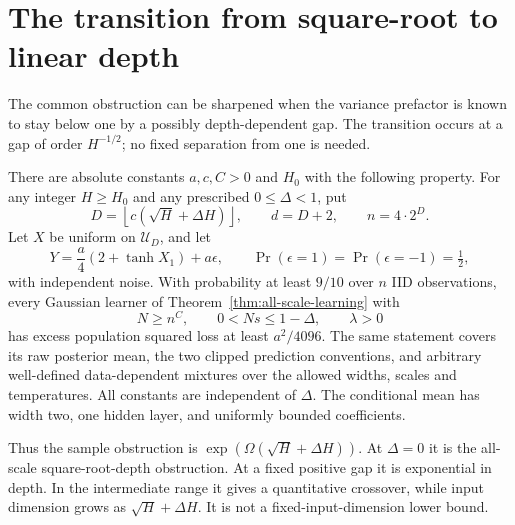 \section{The transition from square-root to linear depth}
\label{sec:prefactor-window}
The common obstruction can be sharpened when the variance prefactor is
known to stay below one by a possibly depth-dependent gap. The transition
occurs at a gap of order $H^{-1/2}$; no fixed separation from one is needed.

\begin{theorem}
\label{thm:prefactor-window}
There are absolute constants $a,c,C>0$ and $H_0$ with the following
property. For any integer $H\ge H_0$ and any prescribed
$0\le\Delta<1$, put
\[
 D=\left\lfloor c(\sqrt H+\Delta H)\right\rfloor,
 \qquad d=D+2,\qquad n=4\cdot2^D.
\]
Let $X$ be uniform on $\mathcal U_D$, and let
\[
 Y=\frac a4(2+\tanh X_1)+a\epsilon,
 \qquad \Pr(\epsilon=1)=\Pr(\epsilon=-1)=\tfrac12,
\]
with independent noise. With probability at least $9/10$ over $n$ IID
observations, every Gaussian learner of Theorem~\ref{thm:all-scale-learning}
with
\[
 N\ge n^C,\qquad 0<Ns\le1-\Delta,\qquad\lambda>0
\]
has excess population squared loss at least $a^2/4096$.
The same statement covers its raw posterior mean, the two clipped
prediction conventions, and arbitrary well-defined data-dependent
mixtures over the allowed widths, scales and temperatures.
All constants are independent of $\Delta$. The conditional mean has
width two, one hidden layer, and uniformly bounded coefficients.
\end{theorem}

Thus the sample obstruction is
$\exp(\Omega(\sqrt H+\Delta H))$. At $\Delta=0$ it is the all-scale
square-root-depth obstruction. At a fixed positive gap it is exponential
in depth. In the intermediate range it gives a quantitative crossover,
while input dimension grows as $\sqrt H+\Delta H$. It is not a
fixed-input-dimension lower bound.

